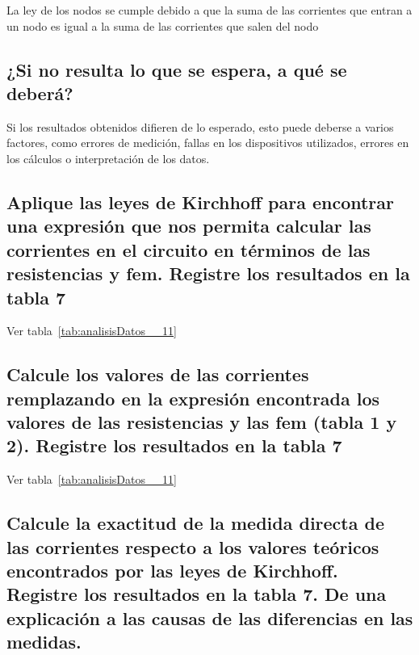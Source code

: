\documentclass[twocolumn, 12pt]{article}
\begin{document}
La ley de los nodos se cumple debido a que la suma de las
corrientes que entran a un nodo es igual a la suma de las
corrientes que salen del nodo

\subsection{¿Si no resulta lo que se espera, a qué se deberá?}

Si los resultados obtenidos difieren de lo esperado, esto
puede deberse a varios factores, como errores de medición,
fallas en los dispositivos utilizados, errores en los
cálculos o interpretación de los datos.

\subsection{Aplique las leyes de Kirchhoff para encontrar una expresión que nos permita calcular las
    corrientes en el circuito en términos de las resistencias y fem. Registre los resultados en
    la tabla 7}

Ver tabla~\ref{tab:analisisDatos__11}

\subsection{Calcule los valores de las corrientes remplazando en la expresión encontrada los valores
    de las resistencias y las fem (tabla 1 y 2). Registre los resultados en la tabla 7}

Ver tabla~\ref{tab:analisisDatos__11}

\subsection{Calcule la exactitud de la medida directa de las corrientes respecto a los valores teóricos
    encontrados por las leyes de Kirchhoff. Registre los resultados en la tabla 7. De una
    explicación a las causas de las diferencias en las medidas.}
\end{document}
